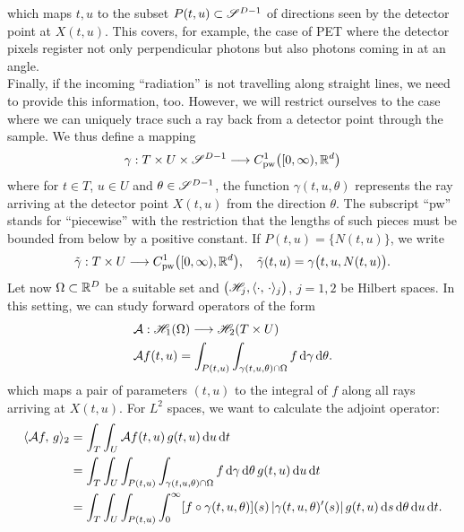 \documentclass{amsart}
\begin{document}
%
which maps $t, u$ to the subset $P(t, u) \subset \mathscr{S}^{D-1}$ of directions seen by the detector point at $X(t, u)$. This covers, for 
example, the case of PET where the detector pixels register not only perpendicular photons but also photons coming in at an angle.\\[1ex]
%
%
Finally, if the incoming ``radiation'' is not travelling along straight lines, we need to provide this information, too. However, we will 
restrict ourselves to the case where we can uniquely trace such a ray back from a detector point through the sample. We thus define a 
mapping
%
\begin{equation}
 \label{eq:general:rays}
 \gamma: T \times U \times \mathscr{S}^{D-1} \longrightarrow C_{\mathrm{pw}}^1\big([0,\infty), {\mathbb{R}}^d\big)
\end{equation} 
%
where for $t \in T$, $u \in U$ and $\theta \in \mathscr{S}^{D-1}$, the function $\gamma(t, u, \theta)$ represents the ray arriving at the 
detector point $X(t, u)$ from the direction $\theta$. The subscript ``pw'' stands for ``piecewise'' with the restriction that the lengths 
of such pieces must be bounded from below by a positive constant.  If $P(t,u) = \lbrace N(t,u)\rbrace$, we write 
%
\begin{equation}
 \label{eq:general:ray_onedir}
 \tilde \gamma: T \times U \longrightarrow C_{\mathrm{pw}}^1\big([0,\infty), {\mathbb{R}}^d\big),\quad \tilde \gamma(t,u) = \gamma\big(t, u, N(t,u)\big).
\end{equation}
%
%
Let now $\Omega \subset {\ensuremath{\mathbb{R}}}^D$ be a suitable set and $\big({\mathscr{H}}_j, \langle \cdot,\,\cdot\rangle_j\big)$, $j=1,2$ be Hilbert spaces. In this 
setting, we can study forward operators of the form
%
\begin{align}
 & {\mathcal{A}}: {\mathscr{H}}_1(\Omega) \longrightarrow {\ensuremath{\mathscr{H}}}_2(T \times U) \notag \\
 \label{eq:general:fwdproj}
 & {\mathcal{A}} f(t, u) = \int_{P(t, u)} \int_{\gamma(t, u, \theta) \cap \Omega} f \, \mathrm{d} \gamma\, \mathrm{d} \theta.
\end{align}
%
which maps a pair of parameters $(t, u)$ to the integral of $f$ along all rays arriving at $X(t, u)$. For $L^2$ spaces, we want to 
calculate the adjoint operator:
%
\begin{align}
 \langle {\ensuremath{\mathcal{A}}} f,\,g\rangle_2 
 &= \int_T \int_U {\mathcal{A}} f(t, u)\, g(t, u)\, \mathrm{d} u\, \mathrm{d} t \notag \\
 &= \int_T \int_U \int_{P(t, u)} \int_{\gamma(t, u, \theta) \cap \Omega} f \, \mathrm{d} \gamma\, \mathrm{d} \theta\, g(t, u)\, \mathrm{d} u\, \mathrm{d} t \notag \\
 \label{eq:general:backproj_calculation_step1}
 &= \int_T \int_U \int_{P(t, u)} \int_0^\infty  [f \circ \gamma(t, u, \theta)](s)\, |\gamma(t, u, \theta)'(s)|\, g(t, u)\, \mathrm{d} s\, 
 \mathrm{d} \theta\, \mathrm{d} u\, \mathrm{d} t.
\end{align}
\end{document}
